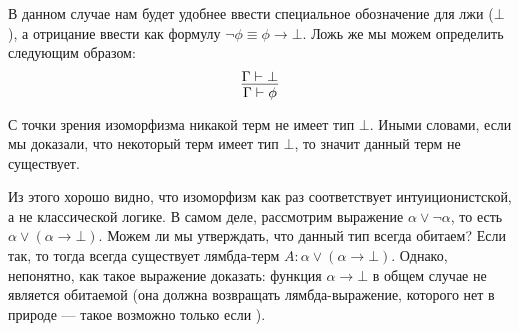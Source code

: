В данном случае нам будет удобнее ввести специальное обозначение для лжи ($\bot$), а отрицание ввести
как формулу $\neg\phi \equiv \phi \rightarrow \bot$. Ложь же мы можем определить следующим образом:
$$\infer{\Gamma\vdash\phi}{\Gamma\vdash\bot}$$

С точки зрения изоморфизма никакой терм не имеет тип $\bot$. Иными словами, если мы доказали, что некоторый
терм имеет тип $\bot$, то значит данный терм не существует. 


Из этого хорошо видно, что изоморфизм 
как раз соответствует интуиционистской, а не классической логике. В самом деле, рассмотрим выражение
$\alpha\vee\neg\alpha$, то есть $\alpha\vee(\alpha\rightarrow\bot)$. Можем ли мы утверждать, что
данный тип всегда обитаем? Если так, то тогда всегда существует лямбда-терм $A: \alpha\vee(\alpha\rightarrow\bot)$.
Однако, непонятно, как такое выражение доказать: функция $\alpha\rightarrow\bot$ в общем случае не 
является обитаемой (она должна возвращать лямбда-выражение, которого нет в природе --- такое возможно только
если ).

